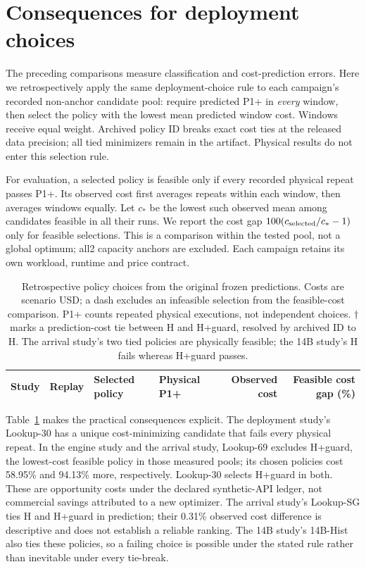 \section{Consequences for deployment choices}
\label{app:decision}
The preceding comparisons measure classification and cost-prediction errors.
Here we retrospectively apply the same deployment-choice rule to each
campaign's recorded non-anchor candidate pool: require predicted P1+ in
\emph{every} window, then select the policy with the lowest mean predicted
window cost. Windows receive equal weight. Archived policy ID breaks exact
cost ties at the released data precision; all tied minimizers remain in the
artifact. Physical results do not enter this selection rule.

For evaluation, a selected policy is feasible only if every recorded physical
repeat passes P1+. Its observed cost first averages repeats within each window,
then averages windows equally. Let $c_*$ be the lowest such observed mean
among candidates feasible in all their runs. We report the cost gap
$100(c_{\rm selected}/c_*-1)$ only for feasible selections. This is a
comparison within the tested pool, not a global optimum; all2 capacity anchors
are excluded. Each campaign retains its own workload, runtime and price contract.

\begin{table}[t]
\centering
\small
\caption{Retrospective policy choices from the original frozen predictions.
Costs are scenario USD; a dash excludes an infeasible selection from the
feasible-cost comparison. P1+ counts repeated physical executions, not independent
choices. $\dagger$ marks a prediction-cost tie between H and H+guard, resolved
by archived ID to H. The arrival study's two tied policies are physically feasible; the 14B study's H
fails whereas H+guard passes.}
\label{tab:decisionutility}
\par\vspace{4pt}
\begin{tabular*}{\linewidth}{@{\extracolsep{\fill}}llllrr@{}}
\toprule
Study & Replay & Selected policy & Physical P1+ & Observed cost & Feasible cost gap (\%)\\
\midrule

\end{tabular*}
\end{table}

Table~\ref{tab:decisionutility} makes the practical consequences explicit.
The deployment study's Lookup-30 has a unique cost-minimizing candidate that fails every physical
repeat. In the engine study and the arrival study, Lookup-69 excludes H+guard, the lowest-cost feasible policy
in those measured pools; its chosen policies cost 58.95\% and 94.13\% more,
respectively. Lookup-30 selects H+guard in both. These are opportunity costs under
the declared synthetic-API ledger, not commercial savings attributed to a
new optimizer. The arrival study's Lookup-SG ties H and H+guard in prediction; their
0.31\% observed cost difference is descriptive and does not establish a
reliable ranking. The 14B study's 14B-Hist also ties these policies, so a failing choice is
possible under the stated rule rather than inevitable under every tie-break.

